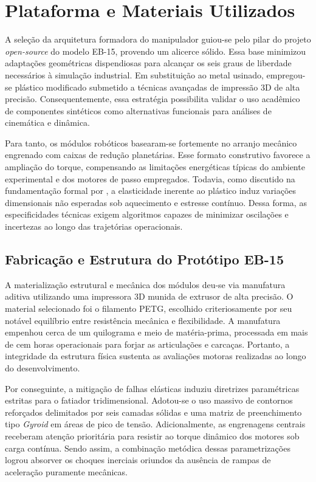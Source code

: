\section{Plataforma e Materiais Utilizados}

A seleção da arquitetura formadora do manipulador guiou-se pelo pilar do projeto \textit{open-source} do modelo EB-15, provendo um alicerce sólido. Essa base minimizou adaptações geométricas dispendiosas para alcançar os seis graus de liberdade necessários à simulação industrial. Em substituição ao metal usinado, empregou-se plástico modificado submetido a técnicas avançadas de impressão 3D de alta precisão. Consequentemente, essa estratégia possibilita validar o uso acadêmico de componentes sintéticos como alternativas funcionais para análises de cinemática e dinâmica.

Para tanto, os módulos robóticos basearam-se fortemente no arranjo mecânico engrenado com caixas de redução planetárias. Esse formato construtivo favorece a ampliação do torque, compensando as limitações energéticas típicas do ambiente experimental e dos motores de passo empregados. Todavia, como discutido na fundamentação formal por , a elasticidade inerente ao plástico induz variações dimensionais não esperadas sob aquecimento e estresse contínuo. Dessa forma, as especificidades técnicas exigem algoritmos capazes de minimizar oscilações e incertezas ao longo das trajetórias operacionais.

\subsection{Fabricação e Estrutura do Protótipo EB-15}

A materialização estrutural e mecânica dos módulos deu-se via manufatura aditiva utilizando uma impressora 3D munida de extrusor de alta precisão. O material selecionado foi o filamento PETG, escolhido criteriosamente por seu notável equilíbrio entre resistência mecânica e flexibilidade. A manufatura empenhou cerca de um quilograma e meio de matéria-prima, processada em mais de cem horas operacionais para forjar as articulações e carcaças. Portanto, a integridade da estrutura física sustenta as avaliações motoras realizadas ao longo do desenvolvimento.

Por conseguinte, a mitigação de falhas elásticas induziu diretrizes paramétricas estritas para o fatiador tridimensional. Adotou-se o uso massivo de contornos reforçados delimitados por seis camadas sólidas e uma matriz de preenchimento tipo \textit{Gyroid} em áreas de pico de tensão. Adicionalmente, as engrenagens centrais receberam atenção prioritária para resistir ao torque dinâmico dos motores sob carga contínua. Sendo assim, a combinação metódica dessas parametrizações logrou absorver os choques inerciais oriundos da ausência de rampas de aceleração puramente mecânicas.

